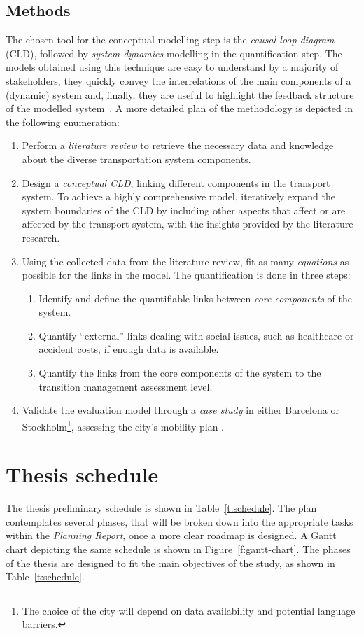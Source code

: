 \documentclass[a4paper,fontsize=10pt,bibliography=totoc]{scrartcl}
\newcommand{\fref}[1]{Figure~\ref{#1}}
\newcommand{\tref}[1]{Table~\ref{#1}}
\begin{document}
\begin{multicols}{2}
\subsection*{Methods}
The chosen tool for the conceptual modelling step is the \textit{causal loop diagram} (CLD), followed by \textit{system dynamics} modelling in the quantification step. The models obtained using this technique are easy to understand by a majority of stakeholders, they quickly convey the interrelations of the main components of a (dynamic) system and, finally, they are useful to highlight the feedback structure of the modelled system~\parencite{ghosh2015dynamic}. A more detailed plan of the methodology is depicted in the following enumeration:
%
\begin{enumerate}[label=(\alph*)]
	\item Perform a \textit{literature review} to retrieve the necessary data and knowledge about the diverse transportation system components.
	\item Design a \textit{conceptual CLD}, linking different components in the transport system. To achieve a highly comprehensive model, iteratively expand the system boundaries of the CLD by including other aspects that affect or are affected by the transport system, with the insights provided by the literature research.
	\item Using the collected data from the literature review, fit as many \textit{equations} as possible for the links in the model. The quantification is done in three steps:
	\begin{enumerate}[label=\roman*.]
		\item Identify and define the quantifiable links between \textit{core components} of the system.
		\item Quantify ``external'' links dealing with social issues, such as healthcare or accident costs, if enough data is available.
		\item Quantify the links from the core components of the system to the transition management assessment level.
	\end{enumerate}
	\item Validate the evaluation model through a \textit{case study} in either Barcelona or Stockholm\footnote{The choice of the city will depend on data availability and potential language barriers.}, assessing the city's mobility plan .
\end{enumerate}

\section{Thesis schedule}
\label{s:schedule}
The thesis preliminary schedule is shown in \tref{t:schedule}. The plan contemplates several phases, that will be broken down into the appropriate tasks within the \textit{Planning Report}, once a more clear roadmap is designed. A Gantt chart depicting the same schedule is shown in \fref{f:gantt-chart}. The phases of the thesis are designed to fit the main objectives of the study, as shown in \tref{t:schedule}.

\printbibliography
\end{multicols}
\end{document}
